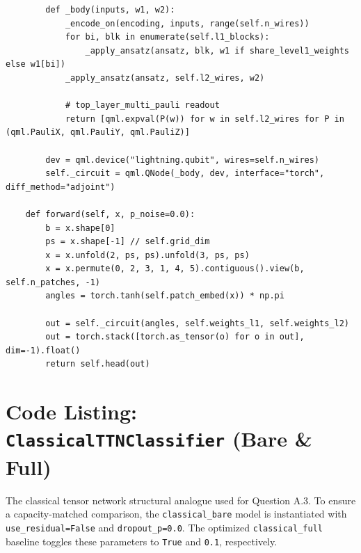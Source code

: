 \documentclass[12pt, a4paper, oneside]{report}
\begin{document}
\begin{verbatim}
        def _body(inputs, w1, w2):
            _encode_on(encoding, inputs, range(self.n_wires))
            for bi, blk in enumerate(self.l1_blocks):
                _apply_ansatz(ansatz, blk, w1 if share_level1_weights else w1[bi])
            _apply_ansatz(ansatz, self.l2_wires, w2)

            # top_layer_multi_pauli readout
            return [qml.expval(P(w)) for w in self.l2_wires for P in (qml.PauliX, qml.PauliY, qml.PauliZ)]

        dev = qml.device("lightning.qubit", wires=self.n_wires)
        self._circuit = qml.QNode(_body, dev, interface="torch", diff_method="adjoint")

    def forward(self, x, p_noise=0.0):
        b = x.shape[0]
        ps = x.shape[-1] // self.grid_dim
        x = x.unfold(2, ps, ps).unfold(3, ps, ps)
        x = x.permute(0, 2, 3, 1, 4, 5).contiguous().view(b, self.n_patches, -1)
        angles = torch.tanh(self.patch_embed(x)) * np.pi

        out = self._circuit(angles, self.weights_l1, self.weights_l2)
        out = torch.stack([torch.as_tensor(o) for o in out], dim=-1).float()
        return self.head(out)
\end{verbatim}

\section*{Code Listing: \texttt{ClassicalTTNClassifier} (Bare \& Full)}
The classical tensor network structural analogue used for Question A.3. To ensure a capacity-matched comparison, the \texttt{classical\_bare} model is instantiated with \texttt{use\_residual=False} and \texttt{dropout\_p=0.0}. The optimized \texttt{classical\_full} baseline toggles these parameters to \texttt{True} and \texttt{0.1}, respectively.
\end{document}
